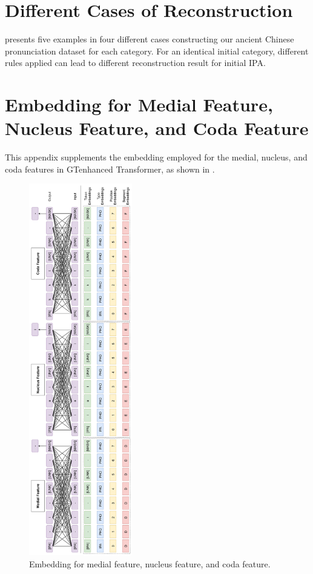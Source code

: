 \section{Different Cases of Reconstruction}
\label{app:reconstruction}
 presents five examples in four different cases constructing our ancient Chinese pronunciation dataset for each category. For an identical initial category, different rules applied can lead to different reconstruction result for initial IPA.

\section{Embedding for Medial Feature, Nucleus Feature, and Coda Feature}
\label{app:embedding}
This appendix supplements the embedding employed for the medial, nucleus, and coda features in GTenhanced Transformer, as shown in .

\begin{figure}[th]
    \centering
    \includegraphics[width=0.4\textwidth]{images/embedding_layer2.png}
    \caption{Embedding for medial feature, nucleus feature, and coda feature.}
    \label{fig:embedding2}
\end{figure}


